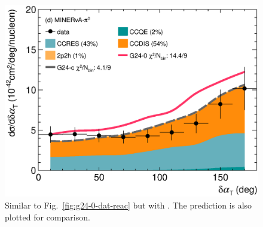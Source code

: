 \begin{figure}
    \includegraphics[width=\dbfigwid\textwidth]{figures/tuning/0026-min_pi0_dalphat_reac_decomp_covfix.eps}
    \caption{\label{fig:g24-c-dat-reac} 
    Similar to Fig.~\ref{fig:g24-0-dat-reac} but with \gC.  The \gZero prediction is also plotted for comparison. 
    } 


\end{figure}
